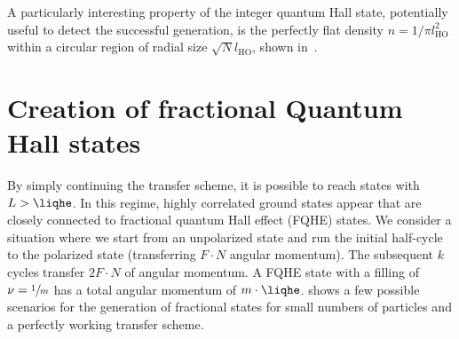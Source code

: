 
A particularly interesting property of the integer quantum Hall state, potentially useful to detect the successful generation, is the perfectly flat density $n=1/\pi l_\text{HO}^2$ within a circular region of radial size $\sqrt{N}l_\text{HO}$, shown in~.


\section{Creation of fractional Quantum Hall states}
By simply continuing the transfer scheme, it is possible to reach states with $L>\liqhe$.
In this regime, highly correlated ground states appear that are closely connected to fractional quantum Hall effect (FQHE) states.
We consider a situation where we start from an unpolarized state and run the initial half-cycle to the polarized state (transferring $F\cdot N$ angular momentum). The subsequent $k$ cycles transfer $2F \cdot N$ of angular momentum. A FQHE state with a filling of $\nu=\sfrac{1}{m}$ has a total angular momentum of $m\cdot \liqhe$.  shows a few possible scenarios for the generation of fractional states for small numbers of particles and a perfectly working transfer scheme.

